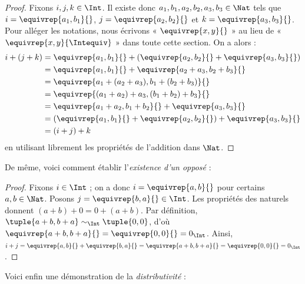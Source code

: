 \documentclass[../../../include/open-logic-section]{subfiles}
\begin{document}
\begin{proof}
Fixons $i, j, k \in \Int$. Il existe donc
$a_1, b_1, a_2, b_2, a_3, b_3 \in \Nat$ tels que
$i = \equivrep{a_1, b_1}{}$, $j = \equivrep{a_2,b_2}{}$ et
$k = \equivrep{a_3, b_3}{}$. Pour alléger les notations, nous écrivons
« $\equivrep{x, y}{}$ » au lieu de
« $\equivrep{x, y}{\Intequiv}$ » dans toute cette section. On a alors :
\begin{align*}
  i + (j + k) &= \equivrep{a_1, b_1}{}+(\equivrep{a_2, b_2}{} + \equivrep{a_3, b_3}{}) \\
  &= \equivrep{a_1, b_1}{} + \equivrep{a_2+a_3, b_2+b_3}{}\\
  &= \equivrep{a_1 + (a_2 + a_3), b_1 + (b_2 + b_3)}{}\\
  &= \equivrep{(a_1 + a_2) + a_3, (b_1 + b_2) + b_3}{}\\
  &= \equivrep{a_1 + a_2, b_1 + b_2}{} + \equivrep{a_3, b_3}{}\\
  &= (\equivrep{a_1, b_1}{} + \equivrep{a_2, b_2}{}) + \equivrep{a_3, b_3}{}\\
  &= (i+j) + k
\end{align*}
en utilisant librement les propriétés de l'addition dans $\Nat$.
\end{proof}

De même, voici comment établir l'\emph{existence d'un opposé} :

\begin{proof}
Fixons $i \in \Int$ ; on a donc $i = \equivrep{a,b}{}$ pour certains
$a,b \in \Nat$. Posons $j = \equivrep{b,a}{} \in \Int$.
Les propriétés des naturels donnent $(a+b) + 0 = 0 + (a+b)$.
Par définition, $\tuple{a+b, b+a} \sim_\Int \tuple{0,0}$, d'où
$\equivrep{a+b, b+a}{} = \equivrep{0, 0}{} = 0_\Int$.
Ainsi, $i + j = \equivrep{a,b}{}+\equivrep{b,a}{}
=\equivrep{a+b, b+a}{}=\equivrep{0,0}{} = 0_\Int$.
\end{proof}

Voici enfin une démonstration de la \emph{distributivité} :
\end{document}
